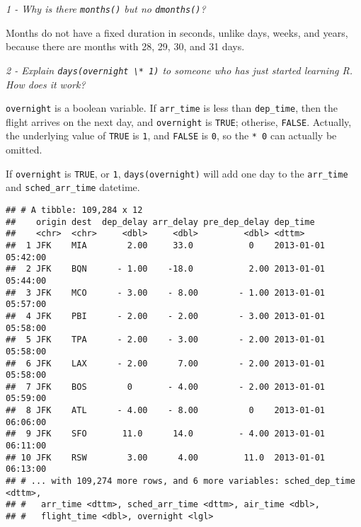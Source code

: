 \documentclass[]{article}
\newenvironment{Shaded}{\begin{snugshade}}{\end{snugshade}}
\newcommand{\KeywordTok}[1]{\textcolor[rgb]{0.13,0.29,0.53}{\textbf{#1}}}
\newcommand{\DataTypeTok}[1]{\textcolor[rgb]{0.13,0.29,0.53}{#1}}
\newcommand{\StringTok}[1]{\textcolor[rgb]{0.31,0.60,0.02}{#1}}
\newcommand{\OperatorTok}[1]{\textcolor[rgb]{0.81,0.36,0.00}{\textbf{#1}}}
\newcommand{\NormalTok}[1]{#1}
\theoremstyle{definition}
\theoremstyle{definition}
\theoremstyle{definition}
\theoremstyle{remark}
\begin{document}
\emph{1 - Why is there \texttt{months()} but no \texttt{dmonths()}?}

Months do not have a fixed duration in seconds, unlike days, weeks, and
years, because there are months with 28, 29, 30, and 31 days.

\emph{2 - Explain \texttt{days(overnight\ \textbackslash{}*\ 1)} to
someone who has just started learning R. How does it work?}

\texttt{overnight} is a boolean variable. If \texttt{arr\_time} is less
than \texttt{dep\_time}, then the flight arrives on the next day, and
\texttt{overnight} is \texttt{TRUE}; otherise, \texttt{FALSE}. Actually,
the underlying value of \texttt{TRUE} is \texttt{1}, and \texttt{FALSE}
is \texttt{0}, so the \texttt{*\ 0} can actually be omitted.

If \texttt{overnight} is \texttt{TRUE}, or \texttt{1},
\texttt{days(overnight)} will add one day to the \texttt{arr\_time} and
\texttt{sched\_arr\_time} datetime.

\begin{Shaded}
\end{Shaded}

\begin{verbatim}
## # A tibble: 109,284 x 12
##    origin dest  dep_delay arr_delay pre_dep_delay dep_time           
##    <chr>  <chr>     <dbl>     <dbl>         <dbl> <dttm>             
##  1 JFK    MIA        2.00     33.0           0    2013-01-01 05:42:00
##  2 JFK    BQN      - 1.00    -18.0           2.00 2013-01-01 05:44:00
##  3 JFK    MCO      - 3.00    - 8.00        - 1.00 2013-01-01 05:57:00
##  4 JFK    PBI      - 2.00    - 2.00        - 3.00 2013-01-01 05:58:00
##  5 JFK    TPA      - 2.00    - 3.00        - 2.00 2013-01-01 05:58:00
##  6 JFK    LAX      - 2.00      7.00        - 2.00 2013-01-01 05:58:00
##  7 JFK    BOS        0       - 4.00        - 2.00 2013-01-01 05:59:00
##  8 JFK    ATL      - 4.00    - 8.00          0    2013-01-01 06:06:00
##  9 JFK    SFO       11.0      14.0         - 4.00 2013-01-01 06:11:00
## 10 JFK    RSW        3.00      4.00         11.0  2013-01-01 06:13:00
## # ... with 109,274 more rows, and 6 more variables: sched_dep_time <dttm>,
## #   arr_time <dttm>, sched_arr_time <dttm>, air_time <dbl>,
## #   flight_time <dbl>, overnight <lgl>
\end{verbatim}
\end{document}
